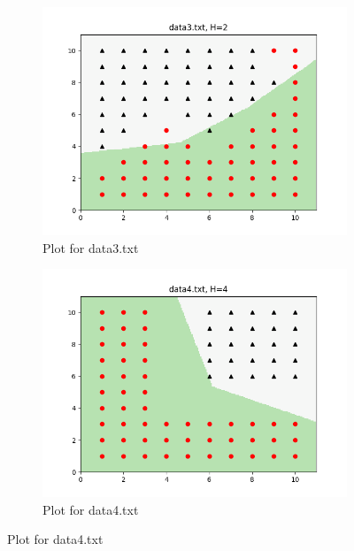 \documentclass{article}
\begin{document}
\begin{figure}[H]
  \vspace{1em} %

  \begin{subfigure}[b]{0.48\textwidth}
    \centering
    \includegraphics[width=\textwidth, height=0.35\textheight, keepaspectratio]{./plots/data3_H2.png}
    \caption{Plot for data3.txt}
    \label{fig:d3}
  \end{subfigure}
  \hfill
  \begin{subfigure}[b]{0.48\textwidth}
    \centering
    \includegraphics[width=\textwidth, height=0.35\textheight, keepaspectratio]{./plots/data4_H4.png}
    \caption{Plot for data4.txt}
    \label{fig:d4}
  \end{subfigure}


\end{figure}
\end{document}

